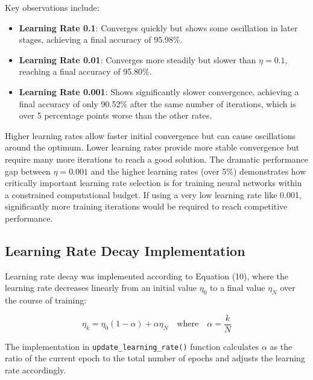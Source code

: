 \documentclass{article}
\begin{document}
\noindent Key observations include:
\begin{itemize}
    \item \textbf{Learning Rate 0.1}: Converges quickly but shows some oscillation in later stages, achieving a final accuracy of 95.98\%.
    \item \textbf{Learning Rate 0.01}: Converges more steadily but slower than $\eta=0.1$, reaching a final accuracy of 95.80\%.
    \item \textbf{Learning Rate 0.001}: Shows significantly slower convergence, achieving a final accuracy of only 90.52\% after the same number of iterations, which is over 5 percentage points worse than the other rates.
\end{itemize}


\noindent Higher learning rates allow faster initial convergence but can cause 
oscillations around the optimum. Lower learning rates provide more stable 
convergence but require many more iterations to reach a good solution. The dramatic 
performance gap between $\eta=0.001$ and the higher learning rates (over 5\%) 
demonstrates how critically important learning rate selection is for training 
neural networks within a constrained computational budget. If using a very low 
learning rate like 0.001, significantly more training iterations would be 
required to reach competitive performance.

\subsection{Learning Rate Decay Implementation}

Learning rate decay was implemented according to Equation (10), where the learning rate decreases linearly from an initial value $\eta_0$ to a final value $\eta_N$ over the course of training:

\begin{equation}
\eta_{k} = \eta_{0}(1-\alpha) + \alpha\eta_{N} \quad \text{where} \quad \alpha = \frac{k}{N}
\end{equation}

The implementation in \texttt{update\_learning\_rate()} function calculates $\alpha$ as the ratio of the current epoch to the total number of epochs and adjusts the learning rate accordingly.
\end{document}
